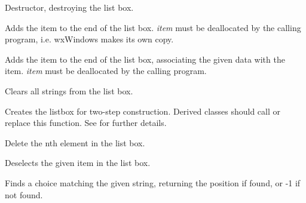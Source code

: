 
Destructor, destroying the list box.



Adds the item to the end of the list box. {\it item} must be deallocated by the calling
program, i.e. wxWindows makes its own copy.


Adds the item to the end of the list box, associating the given data
with the item. {\it item} must be deallocated by the calling program.



Clears all strings from the list box.



Creates the listbox for two-step construction. Derived classes
should call or replace this function. See \rtfsp
for further details.



Delete the nth element in the list box.



Deselects the given item in the list box.



Finds a choice matching the given string, returning the position if found, or
-1 if not found.


